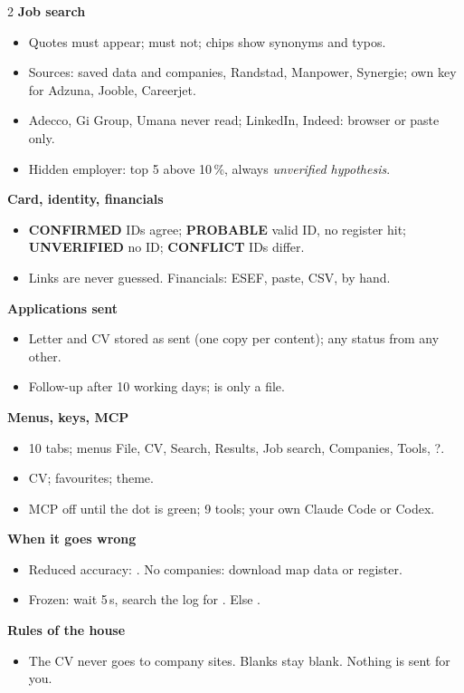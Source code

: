 \begin{multicols}{2}
\textbf{\color{othRed}Job search}
\begin{itemize}
  \item Quotes must appear;  must not; chips show synonyms and typos.
  \item Sources: saved data and companies, Randstad, Manpower, Synergie; own key for Adzuna, Jooble, Careerjet.
  \item Adecco, Gi Group, Umana never read; LinkedIn, Indeed: browser or paste only.
  \item Hidden employer: top 5 above 10\,\%, always \emph{unverified hypothesis}.
\end{itemize}

\textbf{\color{othRed}Card, identity, financials}
\begin{itemize}
  \item \textcolor{othGreen}{\textbf{CONFIRMED}} IDs agree; \textcolor{othBlue}{\textbf{PROBABLE}} valid ID, no register hit; \textcolor{othGray}{\textbf{UNVERIFIED}} no ID; \textcolor{othRed}{\textbf{CONFLICT}} IDs differ.
  \item Links are never guessed. Financials: ESEF, paste, CSV, by hand.
\end{itemize}

\textbf{\color{othRed}Applications sent}
\begin{itemize}
  \item Letter and CV stored as sent (one copy per content); any status from any other.
  \item Follow-up after 10 working days;  is only a file.
\end{itemize}

\textbf{\color{othRed}Menus, keys, MCP}
\begin{itemize}
  \item 10 tabs; menus File, CV, Search, Results, Job search, Companies, Tools, ?.
  \item {} CV;  favourites;  theme.
  \item MCP off until the dot is green; 9 tools; your own Claude Code or Codex.
\end{itemize}

\textbf{\color{othRed}When it goes wrong}
\begin{itemize}
  \item Reduced accuracy: . No companies: download map data or register.
  \item Frozen: wait 5\,s, search the log for . Else .
\end{itemize}

\textbf{\color{othRed}Rules of the house}
\begin{itemize}
  \item The CV never goes to company sites. Blanks stay blank. Nothing is sent for you.
\end{itemize}
\end{multicols}
